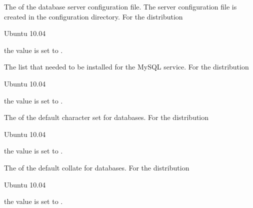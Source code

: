 The  of the database server configuration file. The server configuration
file is created in the configuration directory.
For the distribution
\begin{inparaitem}
\item[\TheDistribution{ubuntu}] Ubuntu 10.04
\end{inparaitem}
the value is set to .


The  list that needed to be installed for the MySQL service.
For the distribution
\begin{inparaitem}
\item[\TheDistribution{ubuntu}] Ubuntu 10.04
\end{inparaitem}
the value is set to .


The  of the default character set for databases.
For the distribution
\begin{inparaitem}
\item[\TheDistribution{ubuntu}] Ubuntu 10.04
\end{inparaitem}
the value is set to .


The  of the default collate for databases.
For the distribution
\begin{inparaitem}
\item[\TheDistribution{ubuntu}] Ubuntu 10.04
\end{inparaitem}
the value is set to .
